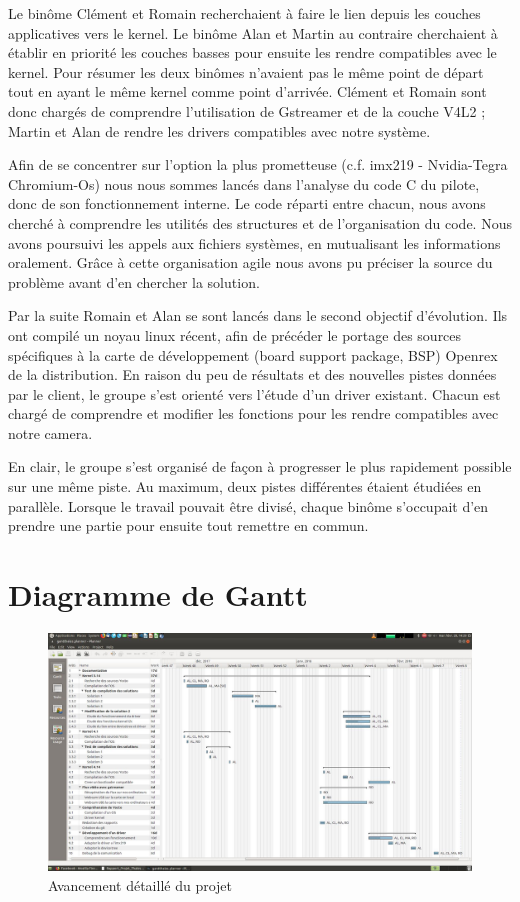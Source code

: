 Le binôme Clément et Romain recherchaient à faire le lien depuis les couches applicatives
vers le kernel. Le binôme Alan et Martin au contraire cherchaient à établir en priorité les
couches basses pour ensuite les rendre compatibles avec le kernel.
Pour résumer les deux binômes n’avaient pas le même point de départ tout en ayant le
même kernel comme point d’arrivée. Clément et Romain sont donc chargés de
comprendre l’utilisation de Gstreamer et de la couche V4L2 ; Martin et Alan de rendre les
drivers compatibles avec notre système.  \medskip

Afin de se concentrer sur l’option la plus prometteuse (c.f. imx219 - Nvidia-Tegra
Chromium-Os) nous nous sommes lancés dans l’analyse du code C du pilote, donc
de son fonctionnement interne. Le code réparti entre chacun, nous avons cherché à
comprendre les utilités des structures et de l’organisation du code. Nous
avons poursuivi les appels aux fichiers systèmes, en mutualisant les informations
oralement. Grâce à cette organisation agile nous avons pu préciser la source du problème
avant d’en chercher la solution.  \medskip

Par la suite Romain et Alan se sont lancés dans le second objectif d’évolution. Ils ont
compilé un noyau linux récent, afin de précéder le portage des sources spécifiques à la
carte de développement (board support package, BSP) Openrex de la distribution.
En raison du peu de résultats et des nouvelles pistes données par le client, le groupe s’est
orienté vers l’étude d’un driver existant. Chacun est chargé de comprendre et modifier les
fonctions pour les rendre compatibles avec notre camera.  \medskip

En clair, le groupe s'est organisé de façon à progresser le plus rapidement possible sur
une même piste. Au maximum, deux pistes différentes étaient étudiées en parallèle.
Lorsque le travail pouvait être divisé, chaque binôme s’occupait d’en prendre une partie
pour ensuite tout remettre en commun.

\section{Diagramme de Gantt}

\begin{figure}[!htb]
    \centering
    \includegraphics[angle=90,trim={2.5cm 2cm 0cm 3.5cm},clip,scale=0.35]{Figures/gantt.png}
    \decoRule
    \caption{Avancement détaillé du projet} \label{fig:planning}
\end{figure}

